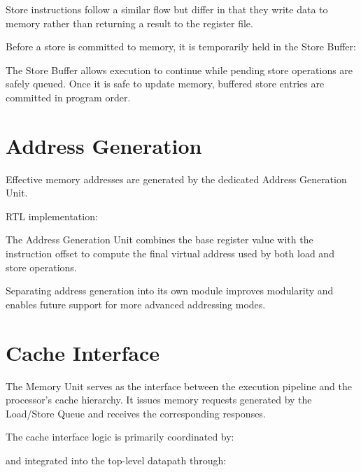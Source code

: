 Store instructions follow a similar flow but differ in that they write data to memory rather than
returning a result to the register file.

Before a store is committed to memory, it is temporarily held in the Store Buffer:

\begin{center}
\end{center}

The Store Buffer allows execution to continue while pending store operations are safely queued.
Once it is safe to update memory, buffered store entries are committed in program order.

\section{Address Generation}

Effective memory addresses are generated by the dedicated Address Generation Unit.

RTL implementation:

\begin{center}
\end{center}

The Address Generation Unit combines the base register value with the instruction offset to
compute the final virtual address used by both load and store operations.

Separating address generation into its own module improves modularity and enables future
support for more advanced addressing modes.

\section{Cache Interface}

The Memory Unit serves as the interface between the execution pipeline and the processor's
cache hierarchy. It issues memory requests generated by the Load/Store Queue and receives
the corresponding responses.

The cache interface logic is primarily coordinated by:

\begin{center}
\end{center}

and integrated into the top-level datapath through:

\begin{center}
\end{center}

